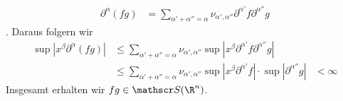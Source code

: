 \documentclass{article}
\begin{document}
\begin{enumerate}[(a)]
        \begin{align*}
            \partial^\alpha (fg) &= \sum_{\alpha' + \alpha'' = \alpha} \nu_{\alpha', \alpha''} \partial^{\alpha'} f \partial^{\alpha''} g
        \end{align*}.
        Daraus folgern wir
        \begin{align*}
            \sup |x^\beta \partial^\alpha (fg)| &\leq \sum_{\alpha' + \alpha'' = \alpha} \nu_{\alpha', \alpha''} \sup |x^\beta \partial^{\alpha'} f \partial^{\alpha''} g|\\
            &\leq \sum_{\alpha' + \alpha'' = \alpha} \nu_{\alpha', \alpha''} \sup |x^\beta \partial^{\alpha'} f| \cdot \sup |\partial^{\alpha''} g|
            &< \infty
        \end{align*}
        Insgesamt erhalten wir $fg \in \mathscr S (\R^n)$.
    \end{enumerate}
\end{document}

